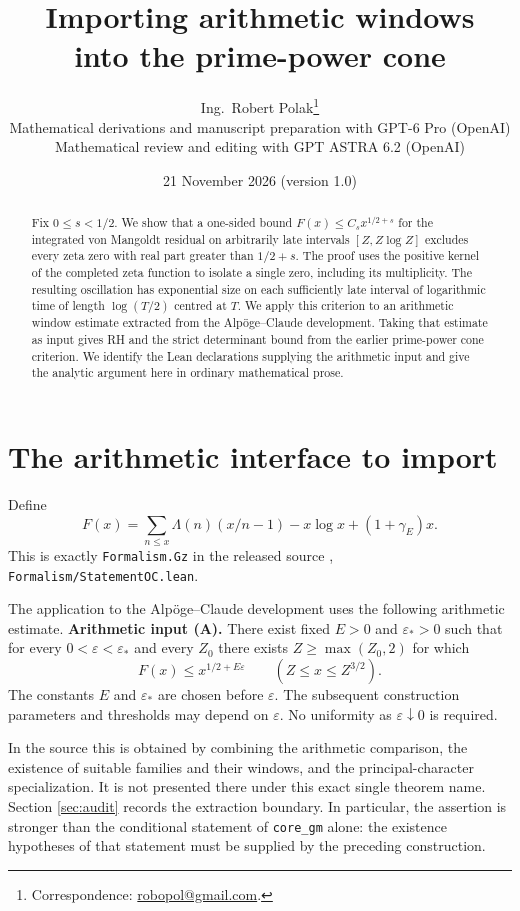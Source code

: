\documentclass[11pt,a4paper]{article}
\title{Importing arithmetic windows\\into the prime-power cone}
\author{Ing.\ Robert Polak\thanks{Correspondence:
\href{mailto:robopol@gmail.com}{robopol@gmail.com}.}\\[0.4em]
\small Mathematical derivations and manuscript preparation with GPT-6 Pro (OpenAI)\\
\small Mathematical review and editing with GPT ASTRA 6.2 (OpenAI)}
\date{21 November 2026 \quad (version 1.0)}
\theoremstyle{remark}\newtheorem{remark}[theorem]{Remark}
\begin{document}
\maketitle
\begin{abstract}
Fix \(0\le s<1/2\). We show that a one-sided bound
\(F(x)\le C_s x^{1/2+s}\) for the integrated von Mangoldt residual on
arbitrarily late intervals \([Z,Z\log Z]\) excludes every zeta zero
with real part greater than \(1/2+s\). The proof uses the positive
kernel of the completed zeta function to isolate a single zero,
including its multiplicity. The resulting oscillation has exponential
size on each sufficiently late interval of logarithmic time of length
\(\log(T/2)\) centred at \(T\).
We apply this criterion to an arithmetic window estimate extracted
from the Alp\"oge--Claude development. Taking that estimate as input
gives RH and the strict determinant bound from the earlier prime-power
cone criterion. We identify the Lean declarations supplying the
arithmetic input and give the analytic argument here in ordinary
mathematical prose.
\end{abstract}

\section{The arithmetic interface to import}
Define
\begin{equation}
 F(x)=\sum_{n\le x}\Lambda(n)(x/n-1)
                 -x\log x+(1+\gamma_E)x.\label{eq:F}
\end{equation}
This is exactly \texttt{Formalism.Gz} in the released source
\cite{Source}, \texttt{Formalism/StatementOC.lean}.

The application to the Alp\"oge--Claude development uses the following
arithmetic estimate.
\medskip
\noindent\textbf{Arithmetic input (A).}
There exist fixed \(E>0\) and \(\varepsilon_*>0\) such that for every
\(0<\varepsilon<\varepsilon_*\) and every \(Z_0\) there exists
\(Z\ge\max(Z_0,2)\) for which
\begin{equation}
 F(x)\le x^{1/2+E\varepsilon}
       \qquad(Z\le x\le Z^{3/2}).\label{eq:external}
\end{equation}
The constants \(E\) and \(\varepsilon_*\) are chosen before
\(\varepsilon\). The subsequent construction parameters and
thresholds may depend on \(\varepsilon\). No uniformity as
\(\varepsilon\downarrow0\) is required.
\medskip

In the source this is obtained by combining the arithmetic
comparison, the existence of suitable families and their windows,
and the principal-character specialization. It is not presented
there under this exact single theorem name. Section
\ref{sec:audit} records the extraction boundary. In particular,
the assertion is stronger than the conditional statement of
\texttt{core\_gm} alone: the existence hypotheses of that statement
must be supplied by the preceding construction.
\end{document}
